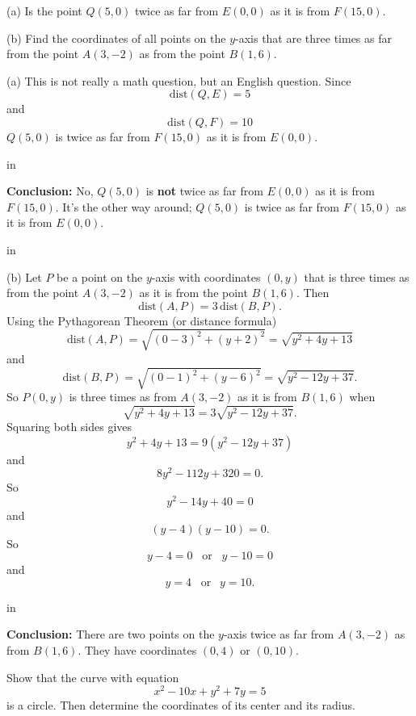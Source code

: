 \documentclass{ximera}
\newcommand{\pskip}{\vskip 0.1 in}
\begin{document}
\begin{example}
(a) Is the point $Q(5,0)$ twice as far from $E(0,0)$ as it is from $F(15,0)$.

(b) Find the coordinates of all points on the $y$-axis that are three times as far from the point $A(3,-2)$ as from the point $B(1,6)$. %
\end{example}

\begin{explanation}
(a) This is not really a math question, but an English question. Since
\[
    \text{dist}(Q,E) = 5
\]
and 
\[
    \text{dist}(Q,F) = 10  %
\]
$Q(5,0)$ is twice as far from $F(15,0)$ as it is from $E(0,0)$.

\pskip

{\bf Conclusion:} No, $Q(5,0)$ is {\bf not} twice as far from $E(0,0)$ as it is from $F(15,0)$. It's the other way around; $Q(5,0)$ is twice as far from $F(15,0)$ as it is from $E(0,0)$. 

\pskip

(b) Let $P$ be a point on the $y$-axis with coordinates $(0,y)$ that is three times as  from the point $A(3,-2)$ as it is from the point $B(1,6)$. Then
\[
    \text{dist}(A,P) = 3 \, \text{dist}(B,P) .
\]
Using the Pythagorean Theorem (or distance formula)
\[
    \text{dist}(A,P) = \sqrt{(0-3)^2 + (y+2)^2} = \sqrt{y^2 + 4y + 13}
\]
and
\[
    \text{dist}(B,P) = \sqrt{(0-1)^2 + (y-6)^2} = \sqrt{y^2-12y+37}.
\]
So $P(0,y)$ is  three times as  from $A(3,-2)$ as it is from $B(1,6)$ when
\[
   \sqrt{y^2 + 4y + 13} = 3 \sqrt{y^2-12y+37} .
\]
Squaring both sides gives
\[
  y^2 + 4y + 13 = 9(y^2-12y+37)
\]
and 
\[
        8y^2 - 112y +320 = 0 .
\]
So
\[
     y^2 - 14y + 40 = 0
\]
and
\[
     (y -4 )(y - 10) = 0.
\]
So
\[
     y-4 = 0    \;\;\;  \text{or} \;\;\; y-10=0
\]
and
\[
    y=4  \;\; \; \text{or} \;\;\ y=10 .
\]

\pskip

{\bf Conclusion:} There are two points on the $y$-axis twice as far from $A(3,-2)$ as from $B(1,6)$. They have coordinates $(0,4)$ or $(0,10)$.

\end{explanation}


\begin{example}
Show that the curve with equation
\[
   x^2  - 10x + y^2 + 7y = 5
\]
is a circle. Then determine the coordinates of its center and its radius.
\end{example}
\end{document}
